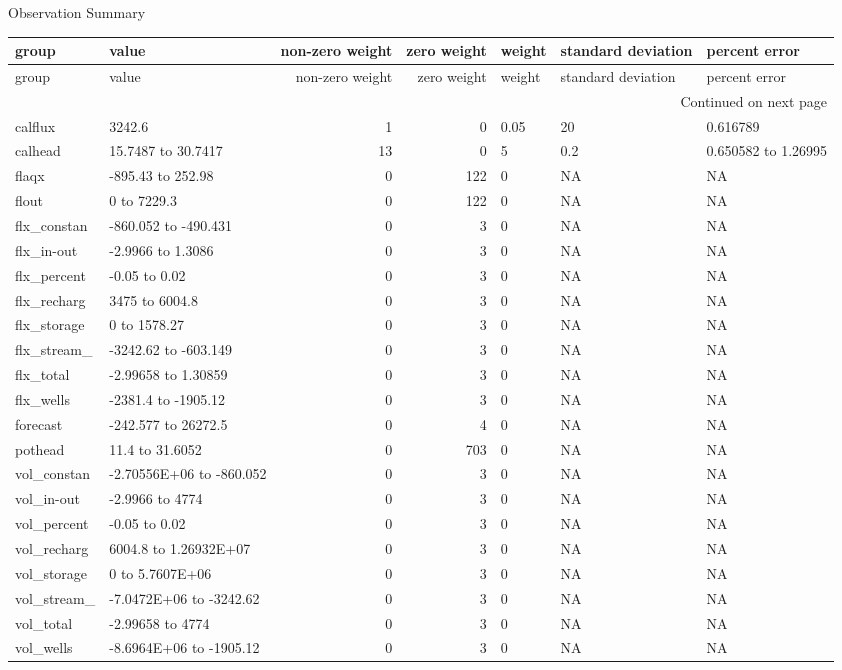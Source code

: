 \documentclass{article}
\begin{document}
\begin{center}
Observation Summary
\end{center}
\begin{center}
\begin{landscape}
\setlength{\LTleft}{-4.0cm}
\begin{longtable}{llrrlll}
group & value & non-zero weight & zero weight & weight & standard deviation & percent error \\
\endfirsthead
group & value & non-zero weight & zero weight & weight & standard deviation & percent error \\
\endhead
\multicolumn{7}{r}{Continued on next page} \\
\endfoot
\endlastfoot
calflux & 3242.6 & 1 & 0 &  0.05 &    20 & 0.616789 \\
calhead & 15.7487 to 30.7417 & 13 & 0 &     5 &   0.2 & 0.650582 to 1.26995 \\
flaqx & -895.43 to 252.98 & 0 & 122 &     0 & NA & NA \\
flout &     0 to 7229.3 & 0 & 122 &     0 & NA & NA \\
flx_constan & -860.052 to -490.431 & 0 & 3 &     0 & NA & NA \\
flx_in-out & -2.9966 to 1.3086 & 0 & 3 &     0 & NA & NA \\
flx_percent & -0.05 to  0.02 & 0 & 3 &     0 & NA & NA \\
flx_recharg &  3475 to 6004.8 & 0 & 3 &     0 & NA & NA \\
flx_storage &     0 to 1578.27 & 0 & 3 &     0 & NA & NA \\
flx_stream_ & -3242.62 to -603.149 & 0 & 3 &     0 & NA & NA \\
flx_total & -2.99658 to 1.30859 & 0 & 3 &     0 & NA & NA \\
flx_wells & -2381.4 to -1905.12 & 0 & 3 &     0 & NA & NA \\
forecast & -242.577 to 26272.5 & 0 & 4 &     0 & NA & NA \\
pothead &  11.4 to 31.6052 & 0 & 703 &     0 & NA & NA \\
vol_constan & -2.70556E+06 to -860.052 & 0 & 3 &     0 & NA & NA \\
vol_in-out & -2.9966 to  4774 & 0 & 3 &     0 & NA & NA \\
vol_percent & -0.05 to  0.02 & 0 & 3 &     0 & NA & NA \\
vol_recharg & 6004.8 to 1.26932E+07 & 0 & 3 &     0 & NA & NA \\
vol_storage &     0 to 5.7607E+06 & 0 & 3 &     0 & NA & NA \\
vol_stream_ & -7.0472E+06 to -3242.62 & 0 & 3 &     0 & NA & NA \\
vol_total & -2.99658 to  4774 & 0 & 3 &     0 & NA & NA \\
vol_wells & -8.6964E+06 to -1905.12 & 0 & 3 &     0 & NA & NA \\
\end{longtable}
\end{landscape}
\end{center}
\end{document}
